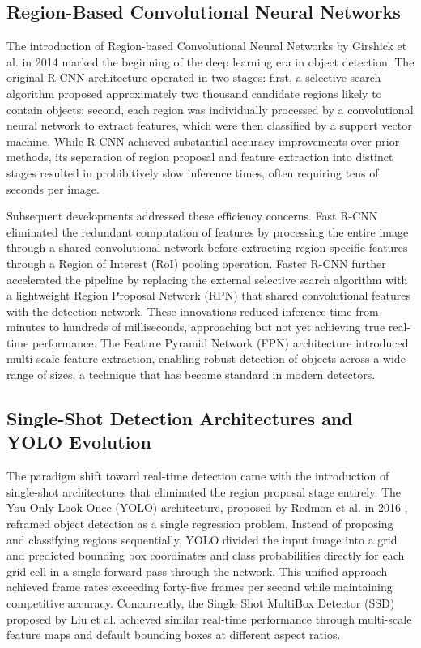 \documentclass[12pt,a4paper]{report}
\begin{document}
\subsection{Region-Based Convolutional Neural Networks}

The introduction of Region-based Convolutional Neural Networks by Girshick et al. in 2014 \cite{rcnn} marked the beginning of the deep learning era in object detection. The original R-CNN architecture operated in two stages: first, a selective search algorithm proposed approximately two thousand candidate regions likely to contain objects; second, each region was individually processed by a convolutional neural network to extract features, which were then classified by a support vector machine. While R-CNN achieved substantial accuracy improvements over prior methods, its separation of region proposal and feature extraction into distinct stages resulted in prohibitively slow inference times, often requiring tens of seconds per image.

Subsequent developments addressed these efficiency concerns. Fast R-CNN \cite{fastrcnn} eliminated the redundant computation of features by processing the entire image through a shared convolutional network before extracting region-specific features through a Region of Interest (RoI) pooling operation. Faster R-CNN \cite{fasterrcnn} further accelerated the pipeline by replacing the external selective search algorithm with a lightweight Region Proposal Network (RPN) that shared convolutional features with the detection network. These innovations reduced inference time from minutes to hundreds of milliseconds, approaching but not yet achieving true real-time performance. The Feature Pyramid Network (FPN) architecture \cite{fpn} introduced multi-scale feature extraction, enabling robust detection of objects across a wide range of sizes, a technique that has become standard in modern detectors.

\subsection{Single-Shot Detection Architectures and YOLO Evolution}

The paradigm shift toward real-time detection came with the introduction of single-shot architectures that eliminated the region proposal stage entirely. The You Only Look Once (YOLO) architecture, proposed by Redmon et al. in 2016 \cite{yolo}, reframed object detection as a single regression problem. Instead of proposing and classifying regions sequentially, YOLO divided the input image into a grid and predicted bounding box coordinates and class probabilities directly for each grid cell in a single forward pass through the network. This unified approach achieved frame rates exceeding forty-five frames per second while maintaining competitive accuracy. Concurrently, the Single Shot MultiBox Detector (SSD) \cite{ssd} proposed by Liu et al. achieved similar real-time performance through multi-scale feature maps and default bounding boxes at different aspect ratios.
\end{document}
